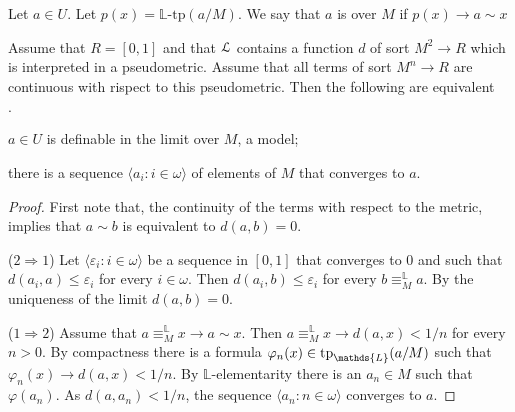 \documentclass[11pt,oneside]{amsart}
\newcommand{\mylabel}[1]{{#1}\hfill}
\renewenvironment{itemize}
  {\begin{list}{$\cdot$}{%
  \setlength{\parskip}{0mm}
  \setlength{\topsep}{.2\baselineskip}
  \setlength{\rightmargin}{0mm}
  \setlength{\listparindent}{0mm}
  \setlength{\itemindent}{0mm}
  \setlength{\labelwidth}{3ex}
  \setlength{\itemsep}{.2\baselineskip}
  \setlength{\parsep}{.2\baselineskip}
  \setlength{\partopsep}{0mm}
  \setlength{\labelsep}{1ex}
  \setlength{\leftmargin}{\labelwidth+\labelsep}
  \let\makelabel\mylabel}}{%
\end{list}}
\renewcommand*{\emph}[1]{%
   \smash{\tikz[baseline]\node[rectangle, fill=teal!25, rounded corners, inner xsep=0.5ex, inner ysep=0.2ex, anchor=base, minimum height = 2.7ex]{#1};}}
\begin{document}
Let $a\in U$. 
Let $p(x)=\mathds{L}\mbox{-tp}(a/M)$.
We say that $a$ is \emph{definable in the limit\/} over $M$ if $p(x)\rightarrow a\sim x$

\begin{fact}
  Assume that $R=[0,1]$ and that ${\EuScript L}$ contains a function $d$ of sort $M^2\to R$ which is interpreted in a pseudometric.
  Assume that all terms of sort $M^n\to R$ are continuous with rispect to this pseudometric.
  Then the following are equivalent
  \begin{itemize}
    \item[1.] $a\in U$ is definable in the limit over $M$, a model;
    \item[2.] there is a sequence $\langle a_i: i\in\omega\rangle$ of elements of $M$ that converges to $a$.
  \end{itemize} 
\end{fact}

\begin{proof}
  First note that, the continuity of the terms with respect to the metric, implies that $a\sim b$ is equivalent to $d(a,b)=0$.

  ($2\Rightarrow1$) Let  $\langle \varepsilon_i: i\in\omega\rangle$ be a sequence in $[0,1]$ that converges to $0$ and such that $d(a_i,a)\le\varepsilon_i$ for every $i\in\omega$.
  Then $d(a_i,b)\le\varepsilon_i$ for every $b\equiv^\mathds{L}_Ma$.
  By the uniqueness of the limit $d(a,b)=0$.

  ($1\Rightarrow2$) Assume that $a\equiv^\mathds{L}_M x\rightarrow a\sim x$.
  Then $a\equiv^\mathds{L}_M x\rightarrow d(a,x)<1/n$ for every $n>0$.
  By compactness there is a formula $\varphi_n(x)\in{\rm tp}_\mathds{L}(a/M)$ such that $\varphi_n(x)\rightarrow d(a,x)<1/n$.
  By $\mathds{L}$-elementarity there is an $a_n\in M$ such that $\varphi(a_n)$.
  As $d(a,a_n)<1/n$, the sequence $\langle a_n: n\in\omega\rangle$ converges to $a$.
\end{proof}
\end{document}

